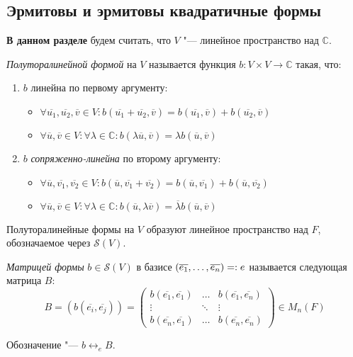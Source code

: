 \subsection{Эрмитовы и эрмитовы квадратичные формы}

\textbf{В данном разделе} будем считать, что $V$ "--- линейное пространство над $\mathbb{C}$.

\begin{definition}
	\textit{Полуторалинейной формой} на $V$ называется функция $b: V \times V \rightarrow \mathbb{C}$ такая, что:
	\begin{enumerate}
		\item $b$ линейна по первому аргументу:
		\begin{itemize}
			\item $\forall \overline{u_1}, \overline{u_2}, \overline{v} \in V: b(\overline{u_1} + \overline{u_2}, \overline{v}) = b(\overline{u_1}, \overline{v}) + b(\overline{u_2}, \overline{v})$
			\item $\forall \overline{u}, \overline{v} \in V: \forall \lambda \in \mathbb{C}: b(\lambda\overline{u}, \overline{v}) = \lambda b(\overline{u}, \overline{v})$
		\end{itemize}
		\item $b$ \textit{сопряженно-линейна} по второму аргументу:
		\begin{itemize}
			\item $\forall \overline{u}, \overline{v_1}, \overline{v_2} \in V: b(\overline{u}, \overline{v_1} + \overline{v_2}) = b(\overline{u}, \overline{v_1}) + b(\overline{u}, \overline{v_2})$
			
			\item $\forall \overline{u}, \overline{v} \in V: \forall \lambda \in \mathbb{C}: b(\overline{u}, \lambda\overline{v}) = \overline{\lambda} b(\overline{u}, \overline{v})$
		\end{itemize}
	\end{enumerate}
	
	Полуторалинейные формы на $V$ образуют линейное пространство над $F$, обозначаемое через $\mathcal{S}(V)$.
\end{definition}

\begin{definition}
	\textit{Матрицей формы} $b \in \mathcal{S}(V)$ в базисе $(\overline{e_1}, \dots, \overline{e_n}) \hm{=:} e$ называется следующая матрица $B$:
	\[B = (b(\overline{e_i}, \overline{e_j})) = \begin{pmatrix}b(\overline{e_1}, \overline{e_1}) & \dots & b(\overline{e_1}, \overline{e_n})\\
		\vdots & \ddots & \vdots\\
		b(\overline{e_n}, \overline{e_1}) & \dots & b(\overline{e_n}, \overline{e_n})
	\end{pmatrix} \in M_n(F)\]
	
	Обозначение "--- $b \leftrightarrow_e B$.
\end{definition}

